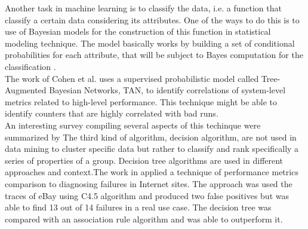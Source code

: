 Another task in machine learning is to classify the data, i.e. a function that classify a certain data considering its attributes. One of the ways to do this is to use of Bayesian models for the construction of this function in statistical modeling technique. The model basically works by building a set of conditional probabilities for each attribute, that will be subject to Bayes computation for the classification \cite{bayes}. \\
The work of Cohen et al. \cite{cohen} uses a supervised probabilistic model called Tree-Augmented Bayesian Networks, TAN, to identify correlations of system-level metrics related to high-level performance. This technique might be able to identify counters that are highly correlated with bad runs.\\ An interesting survey compiling several aspects of this techinque were summarized by \cite{discrete_bayesian}
The third kind of algorithm, decision algorithm, are not used in data mining to cluster specific data but rather to classify and rank specifically a series of properties of a group. Decision tree algorithms are used in different approaches and context.The work in \cite{decision_tree} applied a technique of performance metrics comparison to diagnosing failures in Internet sites.  The approach was used the traces of eBay using C4.5 algorithm and produced two false positives but was able to find 13 out of 14 failures in a real use case. The decision tree was compared with an association rule algorithm and was able to outperform it.\\

